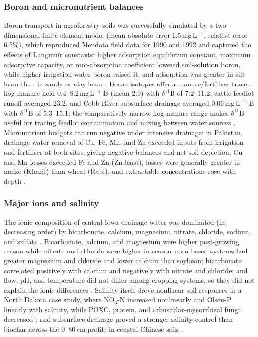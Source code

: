 \subsubsection{Boron and micronutrient balances}
Boron transport in agroforestry soils was successfully simulated by a two-dimensional finite-element model (mean absolute error 1.5\,mg\,L$^{-1}$, relative error 6.5\%), which reproduced Mendota field data for 1990 and 1992 and captured the effects of Langmuir constants: higher adsorption equilibrium constant, maximum adsorptive capacity, or root-absorption coefficient lowered soil-solution boron, while higher irrigation-water boron raised it, and adsorption was greater in silt loam than in sandy or clay loam \parencite{Tayfur2010}. Boron isotopes offer a manure/fertiliser tracer: hog manure held 0.4--8.2\,mg\,L$^{-1}$ B (mean 2.9) with $\delta^{11}$B of 7.2--11.2\textperthousand, cattle-feedlot runoff averaged 23.2\textperthousand, and Cobb River subsurface drainage averaged 0.06\,mg\,L$^{-1}$ B with $\delta^{11}$B of 5.3--15.1\textperthousand; the comparatively narrow hog-manure range makes $\delta^{11}$B useful for tracing feedlot contamination and mixing between water sources \parencite{Komor1997}. Micronutrient budgets can run negative under intensive drainage: in Pakistan, drainage-water removal of Cu, Fe, Mn, and Zn exceeded inputs from irrigation and fertiliser at both sites, giving negative balances and net soil depletion; Cu and Mn losses exceeded Fe and Zn (Zn least), losses were generally greater in maize (Kharif) than wheat (Rabi), and extractable concentrations rose with depth \parencite{Gul2013}.

\subsubsection{Major ions and salinity}
The ionic composition of central-Iowa drainage water was dominated (in decreasing order) by bicarbonate, calcium, magnesium, nitrate, chloride, sodium, and sulfate \parencite{Zimmerman2017b}. Bicarbonate, calcium, and magnesium were higher post-growing season while nitrate and chloride were higher in-season; corn-based systems had greater magnesium and chloride and lower calcium than soybean; bicarbonate correlated positively with calcium and negatively with nitrate and chloride; and flow, pH, and temperature did not differ among cropping systems, so they did not explain the ionic differences \parencite{Zimmerman2017b}. Salinity itself drove nonlinear soil responses in a North Dakota case study, where NO$_3$-N increased nonlinearly and Olsen-P linearly with salinity, while POXC, protein, and arbuscular-mycorrhizal fungi decreased \parencite{Daigh2025}; and subsurface drainage proved a stronger salinity control than biochar across the 0--80\,cm profile in coastal Chinese soils \parencite{Liu2025f}.

